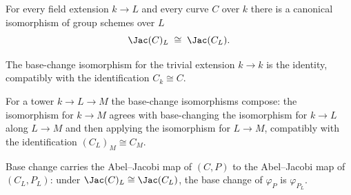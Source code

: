 \begin{theorem}
  \label{thm:baseChangeIso}
  For every field extension \(k \to L\) and every curve \(C\) over \(k\) there is a canonical
  isomorphism of group schemes over \(L\)
  \[
    \Jac(C)_L \;\cong\; \Jac(C_L).
  \]
\end{theorem}

\begin{proposition}
  \label{thm:baseChangeIso_id}
  The base-change isomorphism for the trivial extension \(k \to k\) is the identity, compatibly with
  the identification \(C_k \cong C\).
\end{proposition}

\begin{proposition}
  \label{thm:baseChangeIso_comp}
  For a tower \(k \to L \to M\) the base-change isomorphisms compose: the isomorphism for \(k \to M\)
  agrees with base-changing the isomorphism for \(k \to L\) along \(L \to M\) and then applying the
  isomorphism for \(L \to M\), compatibly with the identification \((C_L)_M \cong C_M\).
\end{proposition}

\begin{proposition}
  \label{thm:baseChange_ofCurve}
  Base change carries the Abel--Jacobi map of \((C, P)\) to the Abel--Jacobi map of \((C_L, P_L)\):
  under \(\Jac(C)_L \cong \Jac(C_L)\), the base change of \(\varphi_P\) is \(\varphi_{P_L}\).
\end{proposition}
